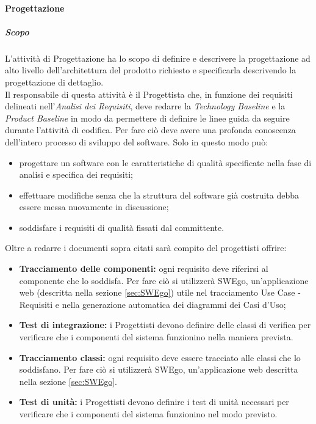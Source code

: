 			
		\paragraph{Progettazione}
			\subparagraph{Scopo}
			\Spazio
			L'attività di Progettazione ha lo scopo di definire e descrivere la progettazione ad alto livello dell'architettura del prodotto richiesto e specificarla descrivendo la progettazione di dettaglio. \\
			Il responsabile di questa attività è il Progettista che, in funzione dei requisiti delineati nell'\textit{Analisi dei Requisiti}, deve redarre la \textit{Technology Baseline} e la \textit{Product Baseline} in modo da permettere di definire le linee guida da seguire durante l'attività di codifica.
			Per fare ciò deve avere una profonda conoscenza dell'intero processo di sviluppo del software.
			Solo in questo modo può:
			\begin{itemize}
				\item progettare un software con le caratteristiche di qualità specificate nella fase di analisi e specifica dei requisiti;
				\item effettuare modifiche senza che la struttura del software già costruita debba essere messa nuovamente in discussione;
				\item soddisfare i requisiti di qualità fissati dal committente.
			\end{itemize}
			Oltre a redarre i documenti sopra citati sarà compito del progettisti offrire:
			\begin{itemize}
				\item \textbf{Tracciamento delle componenti:}
				ogni requisito deve riferirsi al componente che lo soddisfa. Per fare ciò si utilizzerà SWEgo, un'applicazione web (descritta nella sezione \ref{sec:SWEgo}) utile nel tracciamento Use Case - Requisiti e nella generazione automatica dei diagrammi dei Casi d'Uso;
				\item \textbf{Test di integrazione:}
				i Progettisti devono definire delle classi di verifica per verificare che i componenti del sistema funzionino nella maniera prevista.	
				\item \textbf{Tracciamento classi:}
				ogni requisito deve essere tracciato alle classi che lo soddisfano. Per fare ciò si utilizzerà SWEgo, un'applicazione web descritta nella sezione \ref{sec:SWEgo}.
				\item \textbf{Test di unità:}
				i Progettisti devono definire i test di unità necessari per verificare che i componenti del sistema funzionino nel modo previsto.
			\end{itemize}
		
